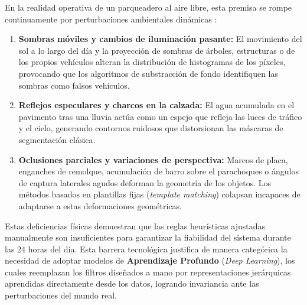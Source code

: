 En la realidad operativa de un parqueadero al aire libre, esta premisa se rompe
continuamente por perturbaciones ambientales dinámicas \cite{rioalvarez2019effects}:
\begin{enumerate}
    \item \textbf{Sombras móviles y cambios de iluminación pasante:} El
        movimiento del sol a lo largo del día y la proyección de sombras de
        árboles, estructuras o de los propios vehículos alteran la distribución
        de histogramas de los píxeles, provocando que los algoritmos de
        substracción de fondo identifiquen las sombras como falsos vehículos.

    \item \textbf{Reflejos especulares y charcos en la calzada:} El agua
        acumulada en el pavimento tras una lluvia actúa como un espejo que
        refleja las luces de tráfico y el cielo, generando contornos ruidosos que
        distorsionan las máscaras de segmentación clásica.

    \item \textbf{Oclusiones parciales y variaciones de perspectiva:} Marcos de
        placa, enganches de remolque, acumulación de barro sobre el parachoques
        o ángulos de captura laterales agudos deforman la geometría de los
        objetos. Los métodos basados en plantillas fijas (\textit{template
        matching}) colapsan incapaces de adaptarse a estas deformaciones geométricas.
\end{enumerate}

Estas deficiencias físicas demuestran que las reglas heurísticas ajustadas
manualmente son insuficientes para garantizar la fiabilidad del sistema durante
las 24 horas del día. Esta barrera tecnológica justifica de manera categórica la
necesidad de adoptar modelos de \textbf{Aprendizaje Profundo} (\textit{Deep
Learning}), los cuales reemplazan los filtros diseñados a mano por
representaciones jerárquicas aprendidas directamente desde los datos, logrando
invariancia ante las perturbaciones del mundo real.
